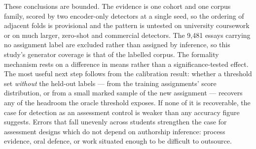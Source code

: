 \documentclass{article}
\begin{document}
These conclusions are bounded. The evidence is one cohort and one corpus
family, scored by two encoder-only detectors at a single seed, so the
ordering of adjacent folds is provisional and the pattern is untested on
university coursework or on much larger, zero-shot and commercial
detectors. The 9,481 essays carrying no assignment label are excluded rather than
assigned by inference, so this study's generator coverage is that of the
labelled corpus. The formality mechanism rests on a difference in means
rather than a significance-tested effect. The most useful next step follows from
the calibration result: whether a threshold set \emph{without} the held-out
labels --- from the training assignments' score distribution, or from a
small marked sample of the new assignment --- recovers any of the headroom
the oracle threshold exposes. If none of it is recoverable, the case for
detection as an assessment control is weaker than any accuracy figure
suggests. Errors that fall unevenly across students strengthen the case for
assessment designs which do not depend on authorship inference: process
evidence, oral defence, or work situated enough to be difficult to
outsource.
\end{document}
